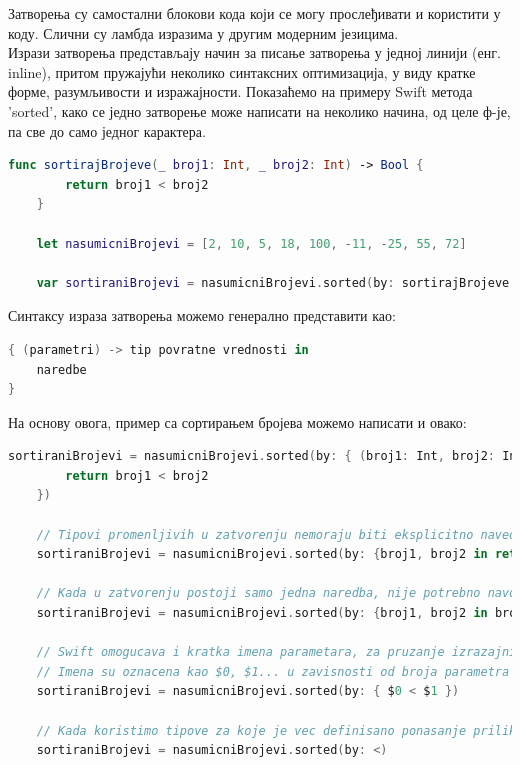 \documentclass[12pt,oneside]{memoir}
\begin{document}
\indent Затворења су самостални блокови кода који се могу прослеђивати и користити у коду. Слични су ламбда изразима у другим модерним језицима. \\
\indent Изрази затворења представљају начин за писање затворења у једној линији (енг. inline), притом пружајући неколико синтаксних оптимизација, у виду кратке форме, разумљивости и изражајности. 
Показаћемо на примеру Swift метода 'sorted', како се једно затворење може написати на неколико начина, од целе ф-је, па све до само једног карактера.

\begin{lstlisting}[caption=\textit{{Затворење кроз ф-ју}}, label={lst:Затворење кроз ф-ју}, language=Swift, frame=single]
    func sortirajBrojeve(_ broj1: Int, _ broj2: Int) -> Bool {
        return broj1 < broj2
    }
    
    let nasumicniBrojevi = [2, 10, 5, 18, 100, -11, -25, 55, 72]
    
    var sortiraniBrojevi = nasumicniBrojevi.sorted(by: sortirajBrojeve
\end{lstlisting}

\indent Синтаксу израза затворења можемо генерално представити као:
\begin{lstlisting}[language=Swift, frame=single]
{ (parametri) -> tip povratne vrednosti in
    naredbe
}
\end{lstlisting}

\indent На основу овога, пример са сортирањем бројева можемо написати и овако:
\begin{lstlisting}[caption=\textit{{Израз затворења за сортирање}}, label={lst:Израз затворења за сортирање}, language=Swift, frame=single]
    sortiraniBrojevi = nasumicniBrojevi.sorted(by: { (broj1: Int, broj2: Int) -> Bool in
        return broj1 < broj2
    })
    
    // Tipovi promenljivih u zatvorenju nemoraju biti eksplicitno navedeni, zato sto se odredjuju na osnovu tipa elemenata niza nad kojim se radi
    sortiraniBrojevi = nasumicniBrojevi.sorted(by: {broj1, broj2 in return broj1 <  broj2})
    
    // Kada u zatvorenju postoji samo jedna naredba, nije potrebno navodjenje kljucne reci 'return', povratna vrednost bice vrednost izvrsenja te naredbe
    sortiraniBrojevi = nasumicniBrojevi.sorted(by: {broj1, broj2 in broj1 < broj2})
    
    // Swift omogucava i kratka imena parametara, za pruzanje izrazajnije sintakse
    // Imena su oznacena kao $0, $1... u zavisnosti od broja parametra u f-ji
    sortiraniBrojevi = nasumicniBrojevi.sorted(by: { $0 < $1 })
    
    // Kada koristimo tipove za koje je vec definisano ponasanje prilikom poredjenja, mozemo proslediti samo kako zelimo da sortiramo clanove niza
    sortiraniBrojevi = nasumicniBrojevi.sorted(by: <)
\end{lstlisting}
\end{document}
